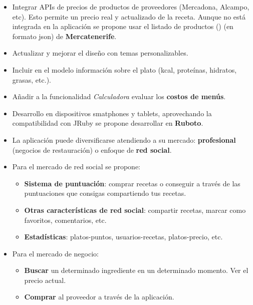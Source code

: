 \begin{itemize}
\item Integrar APIs de precios de productos de proveedores (Mercadona, Alcampo, etc). Esto permite un precio real y actualizado de la receta. Aunque no está integrada en la aplicación se propone usar el listado de productos (\cite{URL:Mercatenerife_Precio_Productos}) (en formato json) de \textbf{Mercatenerife}.

\item Actualizar y mejorar el diseño con temas personalizables.
\item Incluir en el modelo información sobre el plato (kcal, proteínas, hidratos, grasas, etc.).
\item Añadir a la funcionalidad \emph{Calculadora} evaluar los \textbf{costos de menús}.
\item Desarrollo en dispositivos smatphones y tablets, aprovechando la compatibilidad con JRuby se propone desarrollar en \textbf{Ruboto}.

\item La aplicación puede diversificarse atendiendo a su mercado: \textbf{profesional} (negocios de restauración) o enfoque de \textbf{red social}.
	\item Para el mercado de red social se propone:
		\begin{itemize}
			\item \textbf{Sistema de puntuación}: comprar recetas o conseguir a través de las puntuaciones que consigas compartiendo tus recetas.
			\item \textbf{Otras características de red social}: compartir recetas, marcar como favoritos, comentarios, etc.
			\item \textbf{Estadísticas}: platos-puntos, usuarios-recetas, platos-precio, etc.
		\end{itemize}
	\item Para el mercado de negocio:
		\begin{itemize}
			\item \textbf{Buscar} un determinado ingrediente en un determinado momento. Ver el precio actual.
			\item \textbf{Comprar} al proveedor a través de la aplicación.
		\end{itemize}

\end{itemize}
